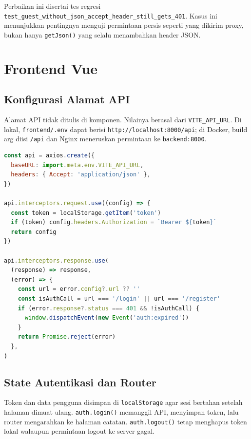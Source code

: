 \documentclass[12pt,a4paper,oneside]{book}
\begin{document}
Perbaikan ini disertai tes regresi
\texttt{test\_guest\_without}\allowbreak\texttt{\_json\_accept}\allowbreak\texttt{\_header\_still\_gets\_401}.
Kasus ini
menunjukkan pentingnya menguji permintaan persis seperti yang dikirim proxy, bukan
hanya \texttt{getJson()} yang selalu menambahkan header JSON.

\section{Frontend Vue}

\subsection{Konfigurasi Alamat API}

Alamat API tidak ditulis di komponen. Nilainya berasal dari
\texttt{VITE\_API\_URL}. Di lokal, \texttt{frontend/.env} dapat berisi
\texttt{http://localhost:8000/api}; di Docker, build arg diisi \texttt{/api} dan
Nginx meneruskan permintaan ke \texttt{backend:8000}.

\begin{lstlisting}[language=JavaScript,caption={Instance Axios dan interceptor token},label={kode:axios}]
const api = axios.create({
  baseURL: import.meta.env.VITE_API_URL,
  headers: { Accept: 'application/json' },
})

api.interceptors.request.use((config) => {
  const token = localStorage.getItem('token')
  if (token) config.headers.Authorization = `Bearer ${token}`
  return config
})

api.interceptors.response.use(
  (response) => response,
  (error) => {
    const url = error.config?.url ?? ''
    const isAuthCall = url === '/login' || url === '/register'
    if (error.response?.status === 401 && !isAuthCall) {
      window.dispatchEvent(new Event('auth:expired'))
    }
    return Promise.reject(error)
  },
)
\end{lstlisting}

\subsection{State Autentikasi dan Router}

Token dan data pengguna disimpan di \texttt{localStorage} agar sesi bertahan setelah
halaman dimuat ulang. \texttt{auth.login()} memanggil API, menyimpan token, lalu
router mengarahkan ke halaman catatan. \texttt{auth.logout()} tetap menghapus token
lokal walaupun permintaan logout ke server gagal.
\end{document}
